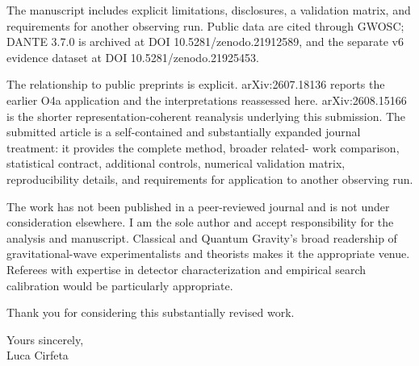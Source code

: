 \documentclass[10pt,a4paper]{article}
\begin{document}
The manuscript includes explicit limitations, disclosures, a validation
matrix, and requirements for another observing run.  Public data are cited
through GWOSC; DANTE 3.7.0 is archived at DOI
10.5281/zenodo.21912589, and the separate v6 evidence dataset at DOI
10.5281/zenodo.21925453.

The relationship to public preprints is explicit. arXiv:2607.18136 reports the
earlier O4a application and the interpretations reassessed here.
arXiv:2608.15166 is the shorter representation-coherent reanalysis underlying
this submission. The submitted article is a self-contained and substantially
expanded journal treatment: it provides the complete method, broader related-
work comparison, statistical contract, additional controls, numerical
validation matrix, reproducibility details, and requirements for application
to another observing run.

The work has not been published in a peer-reviewed journal and is not under
consideration elsewhere. I am the sole author and accept responsibility for
the analysis and manuscript. Classical and Quantum Gravity's broad readership
of gravitational-wave experimentalists and theorists makes it the appropriate
venue. Referees with expertise in detector characterization and empirical
search calibration would be particularly appropriate.

Thank you for considering this substantially revised work.

\vspace{0.35em}
\noindent Yours sincerely,
\nopagebreak\\[0.35em]
Luca Cirfeta
\end{document}
